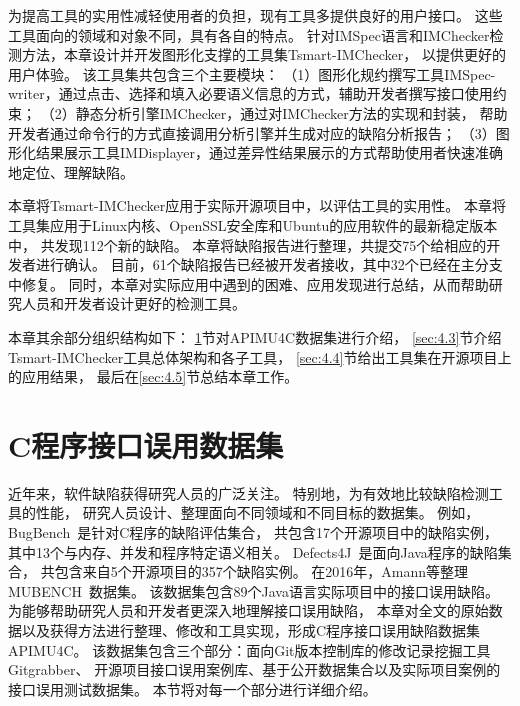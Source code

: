 为提高工具的实用性减轻使用者的负担，现有工具多提供良好的用户接口。
这些工具面向的领域和对象不同，具有各自的特点。
针对IMSpec语言和IMChecker检测方法，本章设计并开发图形化支撑的工具集Tsmart-IMChecker，
以提供更好的用户体验。
该工具集共包含三个主要模块：
（1）图形化规约撰写工具IMSpec-writer，通过点击、选择和填入必要语义信息的方式，辅助开发者撰写接口使用约束；
（2）静态分析引擎IMChecker，通过对IMChecker方法的实现和封装，
帮助开发者通过命令行的方式直接调用分析引擎并生成对应的缺陷分析报告；
（3）图形化结果展示工具IMDisplayer，通过差异性结果展示的方式帮助使用者快速准确地定位、理解缺陷。

本章将Tsmart-IMChecker应用于实际开源项目中，以评估工具的实用性。
本章将工具集应用于Linux内核、OpenSSL安全库和Ubuntu的应用软件的最新稳定版本中，
共发现112个新的缺陷。
本章将缺陷报告进行整理，共提交75个给相应的开发者进行确认。
目前，61个缺陷报告已经被开发者接收，其中32个已经在主分支中修复。
同时，本章对实际应用中遇到的困难、应用发现进行总结，从而帮助研究人员和开发者设计更好的检测工具。



本章其余部分组织结构如下：
\ref{sec:4.2}节对APIMU4C数据集进行介绍，
\ref{sec:4.3}节介绍Tsmart-IMChecker工具总体架构和各子工具，
\ref{sec:4.4}节给出工具集在开源项目上的应用结果，
最后在\ref{sec:4.5}节总结本章工作。

\section{C程序接口误用数据集}
\label{sec:4.2}
近年来，软件缺陷获得研究人员的广泛关注。
特别地，为有效地比较缺陷检测工具的性能，
研究人员设计、整理面向不同领域和不同目标的数据集。
例如，BugBench~\cite{05-bugbench}是针对C程序的缺陷评估集合，
共包含17个开源项目中的缺陷实例，
其中13个与内存、并发和程序特定语义相关。
Defects4J~\cite{14-issta-defects4j}是面向Java程序的缺陷集合，
共包含来自5个开源项目的357个缺陷实例。
在2016年，Amann等整理MUBENCH~\cite{16-msr-mubench}数据集。
该数据集包含89个Java语言实际项目中的接口误用缺陷。
为能够帮助研究人员和开发者更深入地理解接口误用缺陷，
本章对全文的原始数据以及获得方法进行整理、修改和工具实现，形成C程序接口误用缺陷数据集APIMU4C。
该数据集包含三个部分：面向Git版本控制库的修改记录挖掘工具Gitgrabber、
开源项目接口误用案例库、基于公开数据集合以及实际项目案例的接口误用测试数据集。
本节将对每一个部分进行详细介绍。

